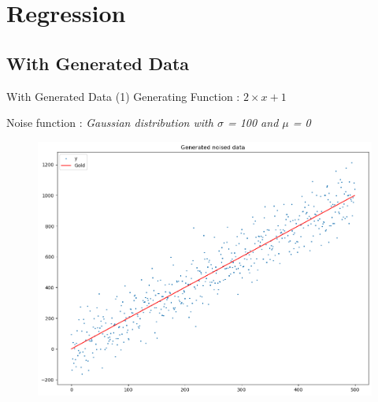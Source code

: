 
\section{Regression}
\subsection{With Generated Data}

\begin{frame}{With Generated Data (1)}
    Generating Function : $2 \times x + 1$
    
    Noise function : \textit{Gaussian distribution with $\sigma$ = 100 and $\mu$ = 0}
    \begin{figure}
        \centering
        \includegraphics[scale=0.35]{img/a.png}
    \end{figure}
\end{frame}


